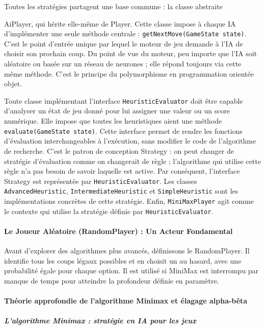 \documentclass[a4paper]{article}
\begin{document}
Toutes les stratégies partagent une base commune : la classe abstraite

AiPlayer, qui hérite elle-même de Player. Cette classe impose à chaque IA d’implémenter une seule méthode centrale : \texttt{getNextMove(GameState state)}. C’est le point d’entrée unique par lequel le moteur de jeu demande à l’IA de choisir son prochain coup. Du point de vue du moteur, peu importe que l’IA soit aléatoire ou basée sur un réseau de neurones ; elle répond toujours via cette même méthode. C’est le principe du polymorphisme en programmation orientée objet.

Toute classe implémentant l'interface \texttt{HeuristicEvaluator} doit être capable d'analyser un état de jeu donné pour lui assigner une valeur ou un score numérique. Elle impose que toutes les heuristiques aient une méthode \texttt{evaluate(GameState state)}. Cette interface permet de rendre les fonctions d’évaluation interchangeables à l’exécution, sans modifier le code de l’algorithme de recherche. C’est le patron de conception Strategy : on peut changer de stratégie d’évaluation comme on changerait de règle ; l’algorithme qui utilise cette règle n’a pas besoin de savoir laquelle est active. Par conséquent, l'interface Strategy est représentée par \texttt{HeuristicEvaluator}. Les classes \texttt{AdvancedHeuristic}, \texttt{IntermediateHeuristic} et \texttt{SimpleHeuristic} sont les implémentations concrètes de cette stratégie. Enfin, \texttt{MiniMaxPlayer} agit comme le contexte qui utilise la stratégie définie par \texttt{HeuristicEvaluator}.


\paragraph{Le Joueur Aléatoire (RandomPlayer) : Un Acteur Fondamental}


Avant d'explorer des algorithmes plus avancés, définissons le RandomPlayer. Il identifie tous les coups légaux possibles et en choisit un au hasard, avec une probabilité égale pour chaque option. Il est utilisé si MiniMax est interrompu par manque de temps pour atteindre la profondeur définie en paramètre.


\paragraph{Théorie approfondie de l'algorithme Minimax et élagage alpha-bêta}

\subparagraph{L'algorithme Minimax : stratégie en IA pour les jeux}
\end{document}
